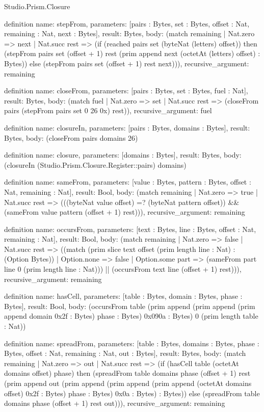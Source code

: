 \begin{lexlean}{Studio.Prism.Closure}
\begin{semanticmodule}
definition{
  name: stepFrom,
  parameters: [pairs : Bytes, set : Bytes, offset : Nat, remaining : Nat, next : Bytes],
  result: Bytes,
  body: (match remaining
    | Nat.zero => next
    | Nat.succ rest => (if (reached pairs set (byteNat (letters) offset)) then (stepFrom pairs set (offset + 1) rest (prim append next (octetAt (letters) offset) : Bytes)) else (stepFrom pairs set (offset + 1) rest next))),
  recursive_argument: remaining
}

definition{
  name: closeFrom,
  parameters: [pairs : Bytes, set : Bytes, fuel : Nat],
  result: Bytes,
  body: (match fuel
    | Nat.zero => set
    | Nat.succ rest => (closeFrom pairs (stepFrom pairs set 0 26 0x) rest)),
  recursive_argument: fuel
}

definition{
  name: closureIn,
  parameters: [pairs : Bytes, domains : Bytes],
  result: Bytes,
  body: (closeFrom pairs domains 26)
}

definition{
  name: closure,
  parameters: [domains : Bytes],
  result: Bytes,
  body: (closureIn (Studio.Prism.Closure.Register::pairs) domains)
}

definition{
  name: sameFrom,
  parameters: [value : Bytes, pattern : Bytes, offset : Nat, remaining : Nat],
  result: Bool,
  body: (match remaining
    | Nat.zero => true
    | Nat.succ rest => (((byteNat value offset) =? (byteNat pattern offset)) && (sameFrom value pattern (offset + 1) rest))),
  recursive_argument: remaining
}

definition{
  name: occursFrom,
  parameters: [text : Bytes, line : Bytes, offset : Nat, remaining : Nat],
  result: Bool,
  body: (match remaining
    | Nat.zero => false
    | Nat.succ rest => ((match (prim slice text offset (prim length line : Nat) : (Option Bytes))
      | Option.none => false
      | Option.some part => (sameFrom part line 0 (prim length line : Nat))) || (occursFrom text line (offset + 1) rest))),
  recursive_argument: remaining
}

definition{
  name: hasCell,
  parameters: [table : Bytes, domain : Bytes, phase : Bytes],
  result: Bool,
  body: (occursFrom table (prim append (prim append (prim append domain 0x2f : Bytes) phase : Bytes) 0x090a : Bytes) 0 (prim length table : Nat))
}

definition{
  name: spreadFrom,
  parameters: [table : Bytes, domains : Bytes, phase : Bytes, offset : Nat, remaining : Nat, out : Bytes],
  result: Bytes,
  body: (match remaining
    | Nat.zero => out
    | Nat.succ rest => (if (hasCell table (octetAt domains offset) phase) then (spreadFrom table domains phase (offset + 1) rest (prim append out (prim append (prim append (prim append (octetAt domains offset) 0x2f : Bytes) phase : Bytes) 0x0a : Bytes) : Bytes)) else (spreadFrom table domains phase (offset + 1) rest out))),
  recursive_argument: remaining
}


\end{semanticmodule}
\end{lexlean}
